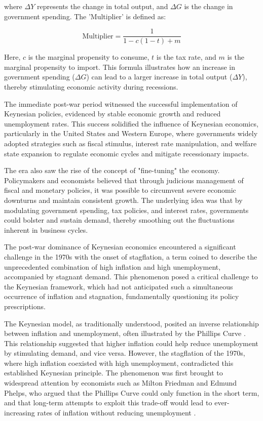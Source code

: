 \documentclass[12pt]{article}
\begin{document}
where \( \Delta Y \) represents the change in total output, and \( \Delta G \) is the change in government spending. The
'Multiplier' is defined as: 

\[ \text{Multiplier} = \frac{1}{1 - c(1 - t) + m} \]

Here, \( c \) is the marginal propensity to consume, \( t \) is the tax rate, and \( m \) is the marginal propensity to
import. This formula illustrates how an increase in government spending (\( \Delta G \)) can lead to a larger increase
in total output (\( \Delta Y \)), thereby stimulating economic activity during recessions. 

The immediate post-war period witnessed the successful implementation of Keynesian policies, evidenced by stable
economic growth and reduced unemployment rates. This success solidified the influence of Keynesian economics,
particularly in the United States and Western Europe, where governments widely adopted strategies such as fiscal
stimulus, interest rate manipulation, and welfare state expansion to regulate economic cycles and mitigate recessionary
impacts. 

The era also saw the rise of the concept of "fine-tuning" the economy. Policymakers and economists believed that through
judicious management of fiscal and monetary policies, it was possible to circumvent severe economic downturns and
maintain consistent growth. The underlying idea was that by modulating government spending, tax policies, and interest
rates, governments could bolster and sustain demand, thereby smoothing out the fluctuations inherent in business cycles. 

The post-war dominance of Keynesian economics encountered a significant challenge in the 1970s with the onset of
stagflation, a term coined to describe the unprecedented combination of high inflation and high unemployment,
accompanied by stagnant demand. This phenomenon posed a critical challenge to the Keynesian framework, which had not
anticipated such a simultaneous occurrence of inflation and stagnation, fundamentally questioning its policy
prescriptions. 

The Keynesian model, as traditionally understood, posited an inverse relationship between inflation and unemployment,
often illustrated by the Phillips Curve \cite{Phi58}. This relationship suggested that higher inflation could help reduce
unemployment by stimulating demand, and vice versa. However, the stagflation of the 1970s, where high inflation
coexisted with high unemployment, contradicted this established Keynesian principle. The phenomenon was first brought to
widespread attention by economists such as Milton Friedman and Edmund Phelps, who argued that the Phillips Curve could
only function in the short term, and that long-term attempts to exploit this trade-off would lead to ever-increasing
rates of inflation without reducing unemployment \cite{Fri72}. 
\end{document}
